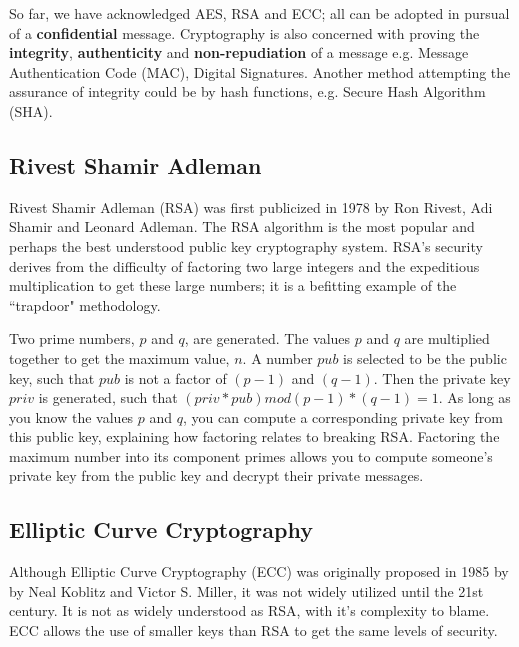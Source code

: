 So far, we have acknowledged AES, RSA and ECC; all can be adopted in pursual of a \textbf{confidential} message. Cryptography is also concerned with proving the \textbf{integrity}, \textbf{authenticity} and \textbf{non-repudiation} of a message e.g. Message Authentication Code (MAC), Digital Signatures. Another method attempting the assurance of integrity could be by hash functions, e.g. Secure Hash Algorithm (SHA).

\subsection{Rivest Shamir Adleman}
 Rivest Shamir Adleman (RSA) was first publicized in 1978 by Ron Rivest, Adi Shamir and Leonard Adleman. The RSA algorithm is the most popular and  perhaps the best understood public key cryptography system. RSA's security derives from the difficulty of factoring two large integers and the expeditious multiplication to get these large numbers; it is a befitting example of the ``trapdoor" methodology. 
 
 Two prime numbers, \(p\) and \(q\), are generated. The values \(p\) and \(q\) are multiplied together to get the maximum value, \(n\). A number \(pub\) is selected to be the public key, such that \(pub\) is not a factor of \((p - 1)\) and \((q - 1)\). Then the private key \(priv\) is generated, such that \((priv * pub) mod (p - 1) * (q - 1) = 1\). 
 As long as you know the values \(p\) and \(q\), you can compute a corresponding private key from this public key, explaining how factoring relates to breaking RSA. Factoring the maximum number into its component primes allows you to compute someone's private key from the public key and decrypt their private messages.

\subsection{Elliptic Curve Cryptography}

Although Elliptic Curve Cryptography (ECC) was originally proposed in 1985 by by Neal Koblitz and Victor S. Miller, it was not widely utilized until the 21st century. It is not as widely understood as RSA, with it's complexity to blame. ECC allows the use of smaller keys than RSA to get the same levels of security. 

